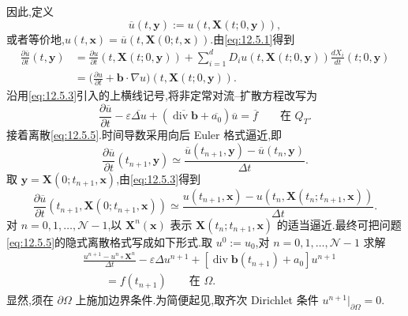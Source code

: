 因此,定义
\begin{equation}\label{eq:12.5.3}
  \overline u(t,\boldsymbol{y}):=u(t,\boldsymbol{X}(t;0,\boldsymbol{y})),
\end{equation}
或者等价地,\(u(t,\boldsymbol{x})=\overline u(t,\boldsymbol{X}(0;t,\boldsymbol{x}))\).由\eqref{eq:12.5.1}得到
\begin{equation}\label{eq:12.5.4}
  \begin{aligned}
    \frac{\partial\overline u}{\partial t}(t,\boldsymbol{y})
      &=\frac{\partial u}{\partial t}(t,\boldsymbol{X}(t;0,\boldsymbol{y}))
        +\sum_{i=1}^d D_i u(t,\boldsymbol{X}(t;0,\boldsymbol{y}))
              \frac{dX_i}{dt}(t;0,\boldsymbol{y})\\
      &=\biggl(\frac{\partial u}{\partial t}+\boldsymbol{b}\cdot\nabla u\biggr)
            (t,\boldsymbol{X}(t;0,\boldsymbol{y})).
  \end{aligned}
\end{equation}
沿用\eqref{eq:12.5.3}引入的上横线记号,将非定常对流--扩散方程改写为
\begin{equation}\label{eq:12.5.5}
  \frac{\partial\overline u}{\partial t}
    -\varepsilon\overline{\Delta u}
    +(\overline{\operatorname{div}\boldsymbol{b}}+\overline{a_0})\overline u
    =\overline f\qquad\text{在 }Q_T.
\end{equation}
接着离散\eqref{eq:12.5.5}.时间导数采用向后 Euler 格式逼近,即
\begin{equation}\label{eq:12.5.6}
  \frac{\partial\overline u}{\partial t}(t_{n+1},\boldsymbol{y})
    \simeq\frac{\overline u(t_{n+1},\boldsymbol{y})-\overline u(t_n,\boldsymbol{y})}{\Delta t}.
\end{equation}
取 \(\boldsymbol{y}=\boldsymbol{X}(0;t_{n+1},\boldsymbol{x})\),由\eqref{eq:12.5.3}得到
\[
  \frac{\partial\overline u}{\partial t}(t_{n+1},\boldsymbol{X}(0;t_{n+1},\boldsymbol{x}))
    \simeq\frac{u(t_{n+1},\boldsymbol{x})-u(t_n,\boldsymbol{X}(t_n;t_{n+1},\boldsymbol{x}))}{\Delta t}.
\]
对 \(n=0,1,\ldots,\mathcal N-1\),以 \(\boldsymbol{X}^n(\boldsymbol{x})\) 表示 \(\boldsymbol{X}(t_n;t_{n+1},\boldsymbol{x})\) 的适当逼近.最终可把问题\eqref{eq:12.5.5}的隐式离散格式写成如下形式.取 \(u^0:=u_0\),对 \(n=0,1,\ldots,\mathcal N-1\) 求解
\begin{equation}\label{eq:12.5.7}
  \begin{aligned}
    &\frac{u^{n+1}-u^n\circ\boldsymbol{X}^n}{\Delta t}
      -\varepsilon\Delta u^{n+1}
      +[\operatorname{div}\boldsymbol{b}(t_{n+1})+a_0]u^{n+1}\\
    &\qquad=f(t_{n+1})\qquad\text{在 }\Omega.
  \end{aligned}
\end{equation}
显然,须在 \(\partial\Omega\) 上施加边界条件.为简便起见,取齐次 Dirichlet 条件 \(u^{n+1}|_{\partial\Omega}=0\).

